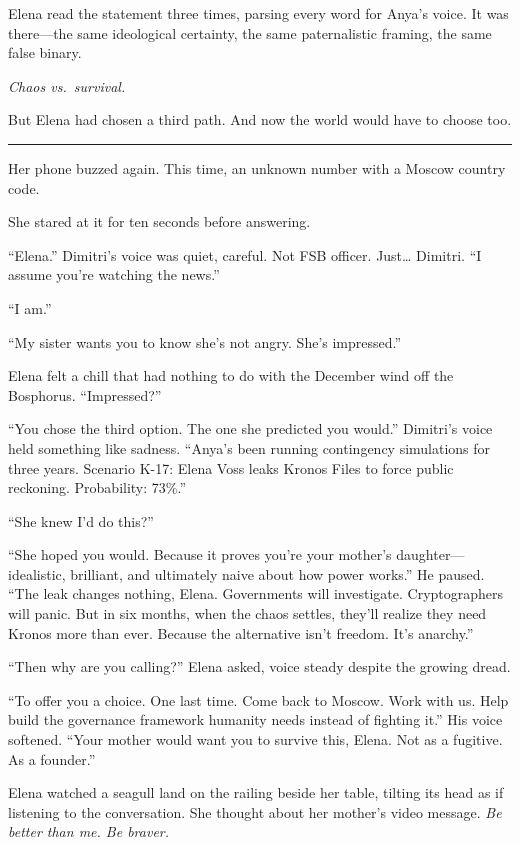 Elena read the statement three times, parsing every word for Anya's voice. It was there---the same ideological certainty, the same paternalistic framing, the same false binary.

\emph{Chaos vs.~survival.}

But Elena had chosen a third path. And now the world would have to choose too.

\begin{center}\rule{0.5\linewidth}{0.5pt}\end{center}

Her phone buzzed again. This time, an unknown number with a Moscow country code.

She stared at it for ten seconds before answering.

``Elena.'' Dimitri's voice was quiet, careful. Not FSB officer. Just\ldots{} Dimitri. ``I assume you're watching the news.''

``I am.''

``My sister wants you to know she's not angry. She's impressed.''

Elena felt a chill that had nothing to do with the December wind off the Bosphorus. ``Impressed?''

``You chose the third option. The one she predicted you would.'' Dimitri's voice held something like sadness. ``Anya's been running contingency simulations for three years. Scenario K-17: Elena Voss leaks Kronos Files to force public reckoning. Probability: 73\%.''

``She knew I'd do this?''

``She hoped you would. Because it proves you're your mother's daughter---idealistic, brilliant, and ultimately naive about how power works.'' He paused. ``The leak changes nothing, Elena. Governments will investigate. Cryptographers will panic. But in six months, when the chaos settles, they'll realize they need Kronos more than ever. Because the alternative isn't freedom. It's anarchy.''

``Then why are you calling?'' Elena asked, voice steady despite the growing dread.

``To offer you a choice. One last time. Come back to Moscow. Work with us. Help build the governance framework humanity needs instead of fighting it.'' His voice softened. ``Your mother would want you to survive this, Elena. Not as a fugitive. As a founder.''

Elena watched a seagull land on the railing beside her table, tilting its head as if listening to the conversation. She thought about her mother's video message. \emph{Be better than me. Be braver.}

